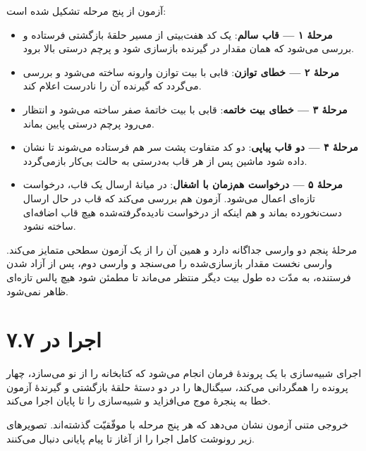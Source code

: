 \documentclass[12pt,a4paper]{article}
\begin{document}
	آزمون از پنج مرحله تشکیل شده است:
	\begin{itemize}
		\item \textbf{مرحلهٔ ۱ --- قاب سالم}: یک کد هفت‌بیتی از مسیر حلقهٔ بازگشتی فرستاده و بررسی می‌شود که همان مقدار در گیرنده بازسازی شود و پرچم درستی بالا برود.
		\item \textbf{مرحلهٔ ۲ --- خطای توازن}: قابی با بیت توازن وارونه ساخته می‌شود و بررسی می‌گردد که گیرنده آن را نادرست اعلام کند.
		\item \textbf{مرحلهٔ ۳ --- خطای بیت خاتمه}: قابی با بیت خاتمهٔ صفر ساخته می‌شود و انتظار می‌رود پرچم درستی پایین بماند.
		\item \textbf{مرحلهٔ ۴ --- دو قاب پیاپی}: دو کد متفاوت پشت سر هم فرستاده می‌شوند تا نشان داده شود ماشین پس از هر قاب به‌درستی به حالت بی‌کار بازمی‌گردد.
		\item \textbf{مرحلهٔ ۵ --- درخواست هم‌زمان با اشغال}: در میانهٔ ارسال یک قاب، درخواست تازه‌ای اعمال می‌شود. آزمون هم بررسی می‌کند که قاب در حال ارسال دست‌نخورده بماند و هم اینکه از درخواست نادیده‌گرفته‌شده هیچ قاب اضافه‌ای ساخته نشود.
	\end{itemize}

	مرحلهٔ پنجم دو وارسی جداگانه دارد و همین آن را از یک آزمون سطحی متمایز می‌کند. وارسی نخست مقدار بازسازی‌شده را می‌سنجد و وارسی دوم، پس از آزاد شدن فرستنده، به مدّت ده طول بیت دیگر منتظر می‌ماند تا مطمئن شود هیچ پالس  تازه‌ای ظاهر نمی‌شود.


	\section*{۷.۷ اجرا در }
	اجرای شبیه‌سازی با یک پروندهٔ فرمان انجام می‌شود که کتابخانه را از نو می‌سازد، چهار پرونده را همگردانی می‌کند، سیگنال‌ها را در دو دستهٔ حلقهٔ بازگشتی و گیرندهٔ آزمون خطا به پنجرهٔ موج می‌افزاید و شبیه‌سازی را تا پایان اجرا می‌کند.


	خروجی متنی آزمون نشان می‌دهد که هر پنج مرحله با موفّقیّت گذشته‌اند. تصویرهای زیر رونوشت کامل اجرا را از آغاز تا پیام پایانی دنبال می‌کنند.

\end{document}
